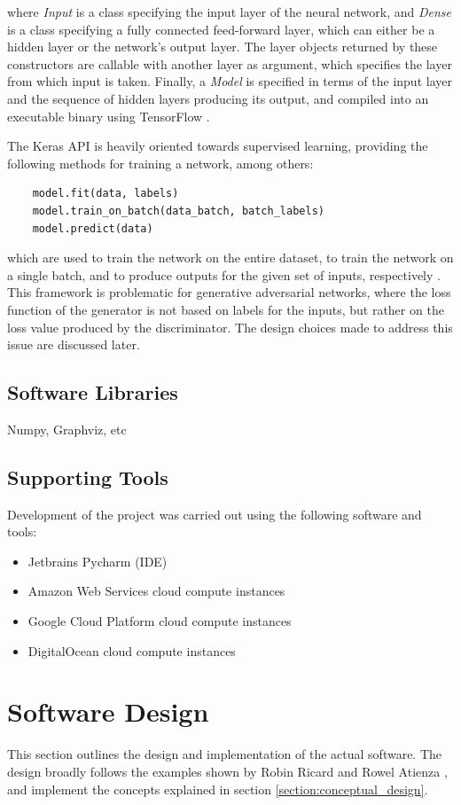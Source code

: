 \documentclass[12pt, titlepage]{report}
\theoremstyle{definition}
\begin{document}
where \textit{Input} is a class specifying the input layer of the neural network, and \textit{Dense} is a class specifying a fully connected feed-forward layer, which can either be a hidden layer or the network's output layer. The layer objects returned by these constructors are callable with another layer as argument, which specifies the layer from which input is taken. Finally, a \textit{Model} is specified in terms of the input layer and the sequence of hidden layers producing its output, and compiled into an executable binary using TensorFlow \cite{keras}.

The Keras API is heavily oriented towards supervised learning, providing the following methods for training a network, among others:

\begin{verbatim}
    model.fit(data, labels)
    model.train_on_batch(data_batch, batch_labels)
    model.predict(data)
\end{verbatim}

which are used to train the network on the entire dataset, to train the network on a single batch, and to produce outputs for the given set of inputs, respectively \cite{keras}. This framework is problematic for generative adversarial networks, where the loss function of the generator is not based on labels for the inputs, but rather on the loss value produced by the discriminator. The design choices made to address this issue are discussed later.

\subsection{Software Libraries}
Numpy, Graphviz, etc

\subsection{Supporting Tools}
Development of the project was carried out using the following software and tools:

\begin{itemize}
\item Jetbrains Pycharm (IDE)
\item Amazon Web Services cloud compute instances
\item Google Cloud Platform cloud compute instances
\item DigitalOcean cloud compute instances
\end{itemize}


\section{Software Design}
This section outlines the design and implementation of the actual software. The design broadly follows the examples shown by Robin Ricard \cite{ricard2017generative} and Rowel Atienza \cite{atienza2017gan}, and implement the concepts explained in section \ref{section:conceptual_design}.
\end{document}
